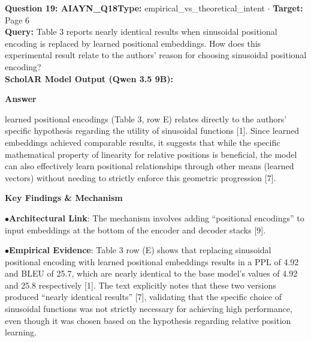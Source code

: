 \documentclass[10pt,a4paper]{article}
\begin{document}
\begin{tcolorbox}[questionbox]
{\noindent\bfseries\large\color{navy} Question 19: AIAYN\_Q18}\hfill {\footnotesize\color{darkteal}\textbf{Type:} empirical\_vs\_theoretical\_intent $\cdot$ \textbf{Target:} Page 6}\\[4pt]
{\noindent\bfseries\color{accentblue} Query: } Table 3 reports nearly identical results when sinusoidal positional encoding is replaced by learned positional embeddings. How does this experimental result relate to the authors' reason for choosing sinusoidal positional encoding?\\[6pt]
{\noindent\bfseries\color{navy} ScholAR Model Output (Qwen 3.5 9B):}\\[2pt]
{\small \noindent \textbf{Answer}\par\vspace{3pt}learned positional encodings (Table 3, row E)  relates directly to the authors' specific hypothesis regarding the utility of sinusoidal functions [1].  Since learned embeddings achieved comparable results, it suggests that while the specific mathematical property of linearity for relative positions is beneficial, the model can also effectively learn positional relationships through other means (learned vectors) without needing to strictly enforce this geometric progression [7].\par\vspace{3pt}\noindent \textbf{Key Findings \& Mechanism}\par\vspace{3pt}\noindent\hspace*{8pt}$\bullet$\hspace*{4pt}\textbf{Architectural Link}: The mechanism involves adding ``positional encodings'' to input embeddings at the bottom of the encoder and decoder stacks [9].\par\vspace{3pt}\noindent\hspace*{8pt}$\bullet$\hspace*{4pt}\textbf{Empirical Evidence}: Table 3 row (E) shows that replacing sinusoidal positional encoding with learned positional embeddings results in a PPL of 4.92 and BLEU of 25.7, which are nearly identical to the base model's values of 4.92 and 25.8 respectively [1]. The text explicitly notes that these two versions produced ``nearly identical results'' [7], validating that the specific choice of sinusoidal functions was not strictly necessary for achieving high performance, even though it was chosen based on the hypothesis regarding relative position learning.}\\[6pt]

\end{tcolorbox}
\end{document}
